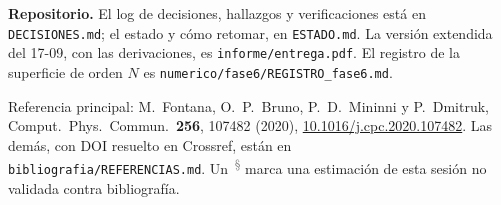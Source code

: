 \documentclass[11pt,a4paper]{article}
\newcommand{\propio}{\textsuperscript{\textcolor{gray}{\,\S}}}
\begin{document}
\noindent\textbf{Repositorio.} El log de decisiones, hallazgos y verificaciones está en
\texttt{DECISIONES.md}; el estado y cómo retomar, en \texttt{ESTADO.md}. La versión extendida
del 17-09, con las derivaciones, es \texttt{informe/entrega.pdf}. El registro de la superficie
de orden $N$ es \texttt{numerico/fase6/REGISTRO\_fase6.md}.

\small\noindent Referencia principal: M.~Fontana, O.~P.~Bruno, P.~D.~Mininni y P.~Dmitruk,
Comput.\ Phys.\ Commun.\ \textbf{256}, 107482 (2020),
\href{https://doi.org/10.1016/j.cpc.2020.107482}{10.1016/j.cpc.2020.107482}. Las demás, con DOI
resuelto en Crossref, están en\\ \texttt{bibliografia/REFERENCIAS.md}. Un \propio{} marca una
estimación de esta sesión no validada contra bibliografía.
\end{document}
